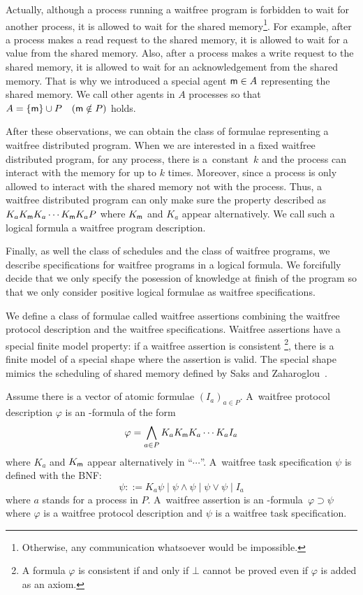   Actually, although a process running a waitfree program is forbidden to wait for another process,
  it is allowed to wait for the shared memory\footnote{Otherwise, any communication
  whatsoever would be impossible.}.
  For example, after a process
  makes a read request to the shared memory,
  it is allowed to wait for a value from the shared memory.
  Also, after a process makes a write request to the shared memory,
  it is allowed to wait for an acknowledgement from the shared memory.
  That is why we introduced a special agent ${\sf m}\in A$ representing the shared memory.
  We call other agents in $A$ processes so that
  $A=\{{\sf m}\}\cup P\quad ({\sf m}\notin P)$ holds.

  After these observations, we can obtain the class of
  formulae representing a waitfree distributed program.
  When we are interested in a fixed waitfree distributed program,
  for any process, there is a~constant~$k$ and the process can interact with the memory for
  up to $k$ times.
  Moreover, since a process is only allowed to interact with the shared memory not with the
  process.
  Thus, a waitfree distributed program can only make sure the property described as
  $K_aK_{\sf m} K_a\cdots K_{\sf m} K_a P$ where $K_{\sf m}$ and $K_a$ appear
  alternatively.
  We call such a logical formula a waitfree program description.

  Finally, as well the class of schedules and the class of waitfree programs,
  we describe specifications for waitfree programs in a logical formula.
  We forcifully decide that we only specify the posession of knowledge at finish of the
  program so that we only consider positive logical formulae as waitfree specifications.

  We define a class of formulae called waitfree assertions combining the waitfree protocol
  description and the waitfree specifications.
  Waitfree assertions have a special finite model property:
  if a waitfree assertion is consistent%
  \footnote{A formula $\varphi$ is consistent if and only if $\bot$ cannot be proved even if
  $\varphi$ is added as an axiom.}, there is a finite model of a special shape
  where the assertion is valid.
  The special shape mimics the scheduling of shared memory
  defined by Saks and Zaharoglou~\cite{saks2000wait}.

  \begin{definition}
   Assume there is a vector of atomic formulae $(I_a)_{a\in P}$.
   A~waitfree protocol description $\varphi$ is an \iec-formula of the form
   \[
   \varphi = \bigwedge_{a\in P} K_a K_{\sf m} K_a \cdots K_a I_a
   \]
   where $K_a$ and $K_{\sf m}$ appear alternatively in ``$\cdots$''.
   A~waitfree task specification $\psi$ is defined with the BNF:
   \[
   \psi ::= K_a\psi\mid \psi\land\psi\mid \psi\vee\psi\mid I_a
   \]
   where $a$ stands for a process in $P$.
   A~waitfree assertion is an \iec-formula~$\varphi\supset\psi$ where $\varphi$ is a
   waitfree protocol description and $\psi$ is a waitfree task specification.
  \end{definition}

